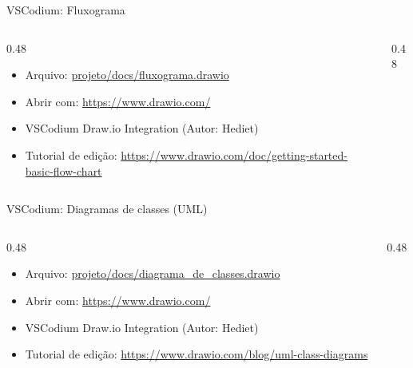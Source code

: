 \documentclass{beamer}
\begin{document}
\begin{frame}{VSCodium: Fluxograma}
    \begin{columns}[t]
        \begin{column}[t]{0.48\textwidth}
            
            \begin{itemize}
                \item Arquivo: \url{projeto/docs/fluxograma.drawio}
                \item Abrir com: \url{https://www.drawio.com/}
                \item VSCodium Draw.io Integration (Autor: Hediet)
                \item Tutorial de edição: \url{https://www.drawio.com/doc/getting-started-basic-flow-chart}
            \end{itemize}
        \end{column}
        
        \begin{column}[t]{0.48\textwidth}
        \end{column}
    \end{columns}   
\end{frame}


\begin{frame}{VSCodium: Diagramas de classes (UML)}
    \begin{columns}[t]
        \begin{column}[t]{0.48\textwidth}
            \begin{itemize}
                \item Arquivo: \url{projeto/docs/diagrama_de_classes.drawio}
                \item Abrir com: \url{https://www.drawio.com/}
                \item VSCodium Draw.io Integration (Autor: Hediet)
                \item Tutorial de edição: \url{https://www.drawio.com/blog/uml-class-diagrams}
            \end{itemize}
        \end{column}
        
        \begin{column}[t]{0.48\textwidth}
        \end{column}
    \end{columns}   
\end{frame}
\end{document}
